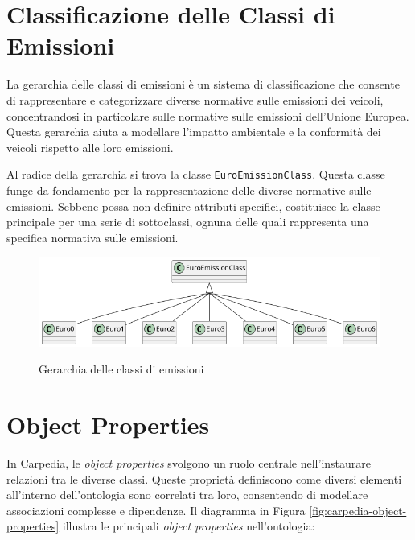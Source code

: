 \section{Classificazione delle Classi di Emissioni}

La gerarchia delle classi di emissioni è un sistema di classificazione che  consente di rappresentare e categorizzare diverse normative sulle emissioni dei veicoli, concentrandosi in particolare sulle normative sulle emissioni dell'Unione Europea. Questa gerarchia aiuta a modellare l'impatto ambientale e la conformità dei veicoli rispetto alle loro emissioni.

Al radice della gerarchia si trova la classe \texttt{EuroEmissionClass}. Questa classe funge da fondamento per la rappresentazione delle diverse normative sulle emissioni. Sebbene possa non definire attributi specifici, costituisce la classe principale per una serie di sottoclassi, ognuna delle quali rappresenta una specifica normativa sulle emissioni.

\begin{figure}
    \caption{Gerarchia delle classi di emissioni}
    \includegraphics[width=\textwidth]{figures/carpedia-euro-emission.png}
    \label{fig:carpedia-euro-emission}
\end{figure}

\section{Object Properties}

In Carpedia, le \textit{object properties} svolgono un ruolo centrale nell'instaurare relazioni tra le diverse classi. Queste proprietà definiscono come diversi elementi all'interno dell'ontologia sono correlati tra loro, consentendo di modellare associazioni complesse e dipendenze. Il diagramma in Figura \ref{fig:carpedia-object-properties} illustra le principali \textit{object properties} nell'ontologia:

